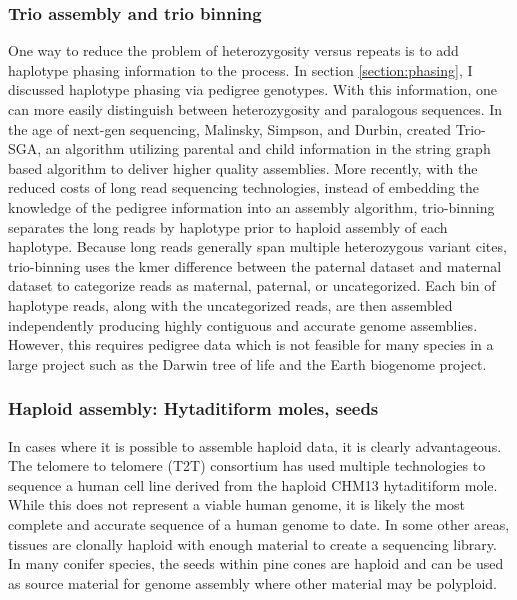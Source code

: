 \subsubsection{Trio assembly and trio binning}
\par{
One way to reduce the problem of heterozygosity versus repeats is to add haplotype phasing information to the process. In section \ref{section:phasing}, I discussed haplotype phasing via pedigree genotypes. With this information, one can more easily distinguish between heterozygosity and paralogous sequences. In the age of next-gen sequencing, Malinsky, Simpson, and Durbin, created Trio-SGA, an algorithm utilizing parental and child information in the string graph based algorithm to deliver higher quality assemblies\cite{trio-sga}. More recently, with the reduced costs of long read sequencing technologies, instead of embedding the knowledge of the pedigree information into an assembly algorithm, trio-binning\cite{triobinning} separates the long reads by haplotype prior to haploid assembly of each haplotype. Because long reads generally span multiple heterozygous variant cites, trio-binning uses the kmer difference between the paternal dataset and maternal dataset to categorize reads as maternal, paternal, or uncategorized. Each bin of haplotype reads, along with the uncategorized reads, are then assembled independently producing highly contiguous and accurate genome assemblies. However, this requires pedigree data which is not feasible for many species in a large project such as the Darwin tree of life and the Earth biogenome project.
}

\subsubsection{Haploid assembly: Hytaditiform moles, seeds}

\par{
In cases where it is possible to assemble haploid data, it is clearly advantageous. The telomere to telomere (T2T) consortium has used multiple technologies to sequence a human cell line derived from the haploid CHM13 hytaditiform mole\cite{T2T2}. While this does not represent a viable human genome, it is likely the most complete and accurate sequence of a human genome to date. In some other areas, tissues are clonally haploid with enough material to create a sequencing library. In many conifer species, the seeds within pine cones are haploid and can be used as source material for genome assembly where other material may be polyploid\cite{coniferhaploid}.
}
